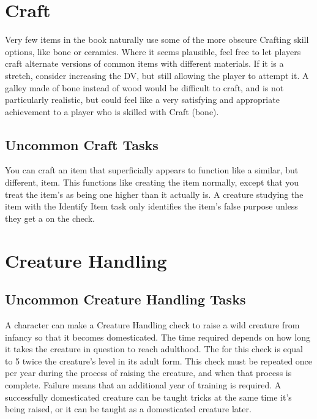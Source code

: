 \section{Craft}

  Very few items in the book naturally use some of the more obscure Crafting skill options, like bone or ceramics.
  Where it seems plausible, feel free to let players craft alternate versions of common items with different materials.
  If it is a stretch, consider increasing the DV, but still allowing the player to attempt it.
  A galley made of bone instead of wood would be difficult to craft, and is not particularly realistic, but could feel like a very satisfying and appropriate achievement to a player who is skilled with Craft (bone).

  \subsection{Uncommon Craft Tasks}
     You can craft an item that superficially appears to function like a similar, but different, item.
    This functions like creating the item normally, except that you treat the item's  as being one higher than it actually is.
    A creature studying the item with the Identify Item task only identifies the item's false purpose unless they get a  on the check.

\section{Creature Handling}

  \subsection{Uncommon Creature Handling Tasks}
     A character can make a Creature Handling check to raise a wild creature from infancy so that it becomes domesticated.
    The time required depends on how long it takes the creature in question to reach adulthood.
    The  for this check is equal to 5 \add twice the creature's level in its adult form.
    This check must be repeated once per year during the process of raising the creature, and when that process is complete.
    Failure means that an additional year of training is required.
    A successfully domesticated creature can be taught tricks at the same time it's being raised, or it can be taught as a domesticated creature later.

